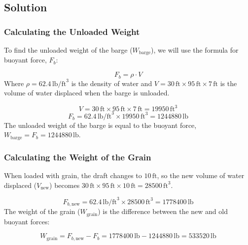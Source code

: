 \documentclass[12pt]{article}
\begin{document}
\subsection*{Solution}

\subsubsection*{Calculating the Unloaded Weight}
To find the unloaded weight of the barge (\(W_{\text{barge}}\)), we will use the formula for buoyant force, \(F_b\):

\[
F_b = \rho \cdot V
\]
Where \( \rho = 62.4 \, \text{lb/ft}^3 \) is the density of water and \( V = 30 \, \text{ft} \times 95 \, \text{ft} \times 7 \, \text{ft} \) is the volume of water displaced when the barge is unloaded.

\[
V = 30 \, \text{ft} \times 95 \, \text{ft} \times 7 \, \text{ft} = 19950 \, \text{ft}^3
\]
\[
F_b = 62.4 \, \text{lb/ft}^3 \times 19950 \, \text{ft}^3 = 1244880 \, \text{lb}
\]
The unloaded weight of the barge is equal to the buoyant force, \(W_{\text{barge}} = F_b = 1244880 \, \text{lb}\).

\subsubsection*{Calculating the Weight of the Grain}
When loaded with grain, the draft changes to \(10 \, \text{ft}\), so the new volume of water displaced (\(V_{\text{new}}\)) becomes \(30 \, \text{ft} \times 95 \, \text{ft} \times 10 \, \text{ft} = 28500 \, \text{ft}^3\).

\[
F_{b, \text{new}} = 62.4 \, \text{lb/ft}^3 \times 28500 \, \text{ft}^3 = 1778400 \, \text{lb}
\]
The weight of the grain (\(W_{\text{grain}}\)) is the difference between the new and old buoyant forces:

\[
W_{\text{grain}} = F_{b, \text{new}} - F_b = 1778400 \, \text{lb} - 1244880 \, \text{lb} = 533520 \, \text{lb}
\]
\end{document}
